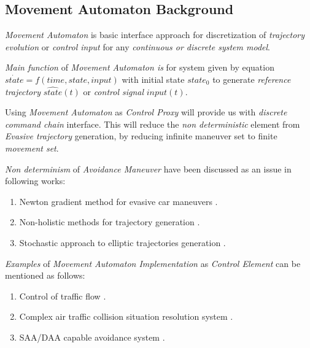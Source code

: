 \subsection{Movement Automaton Background}\label{sec:MovementAutomatonBackground}

    \noindent\emph{Movement Automaton} is basic interface approach for discretization of \emph{trajectory evolution}  or \emph{control input} for any \emph{continuous or discrete system model}.
    
    \emph{Main function} of \emph{Movement Automaton is} for system given by equation $\dot{state}=f(time,state,input)$ with initial state $state_0$ to generate \emph{reference trajectory} $\hat{state}(t)$ or \emph{control signal} $input(t)$.
    
    Using \emph{Movement Automaton} as \emph{Control Proxy} will provide us with \emph{discrete command chain} interface. This will reduce the \emph{non deterministic} element from \emph{Evasive trajectory} generation, by reducing infinite maneuver set to finite \emph{movement set}.
    
    \emph{Non determinism} of \emph{Avoidance Maneuver} have been discussed as an issue in following works:
    \begin{enumerate}
        \item Newton gradient method for evasive car maneuvers \cite{vsantin2011combined}.
        \item Non-holistic methods for trajectory generation \cite{pin1990autonomous}.
        \item Stochastic approach to elliptic trajectories generation \cite{andrzejak2001epileptic}.
    \end{enumerate}
    
\noindent\emph{Examples} of \emph{Movement Automaton Implementation} as \emph{Control Element} can be mentioned as follows:
    \begin{enumerate}
        \item Control of traffic flow \cite{kuwata2009real}.
        \item Complex air traffic collision situation resolution system  \cite{frazzoli2001robust,frazzoli2000trajectory}.
        \item SAA/DAA capable avoidance system \cite{gomola2017obstacle}.
    \end{enumerate}


